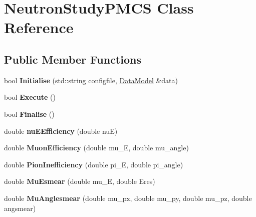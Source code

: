 \hypertarget{classNeutronStudyPMCS}{
\section{NeutronStudyPMCS Class Reference}
\label{classNeutronStudyPMCS}
}
\subsection*{Public Member Functions}
\begin{DoxyCompactItemize}
\item 
\hypertarget{classNeutronStudyPMCS_a044b07d39e07fbac5764b8788f11a3ec}{
bool {\bfseries Initialise} (std::string configfile, \hyperlink{classDataModel}{DataModel} \&data)}
\label{classNeutronStudyPMCS_a044b07d39e07fbac5764b8788f11a3ec}

\item 
\hypertarget{classNeutronStudyPMCS_a1cc06822548c3febc0708db5b59c343b}{
bool {\bfseries Execute} ()}
\label{classNeutronStudyPMCS_a1cc06822548c3febc0708db5b59c343b}

\item 
\hypertarget{classNeutronStudyPMCS_aa4e1c744c42f16c63b4ddefefda81922}{
bool {\bfseries Finalise} ()}
\label{classNeutronStudyPMCS_aa4e1c744c42f16c63b4ddefefda81922}

\item 
\hypertarget{classNeutronStudyPMCS_acdaa5568f44221b53168e490969393bf}{
double {\bfseries nuEEfficiency} (double nuE)}
\label{classNeutronStudyPMCS_acdaa5568f44221b53168e490969393bf}

\item 
\hypertarget{classNeutronStudyPMCS_aefc2ab996c1c513c0f032931f3f67e7e}{
double {\bfseries MuonEfficiency} (double mu\_\-E, double mu\_\-angle)}
\label{classNeutronStudyPMCS_aefc2ab996c1c513c0f032931f3f67e7e}

\item 
\hypertarget{classNeutronStudyPMCS_ad0cfe53c957f4a47fbe60f7bc390e32b}{
double {\bfseries PionInefficiency} (double pi\_\-E, double pi\_\-angle)}
\label{classNeutronStudyPMCS_ad0cfe53c957f4a47fbe60f7bc390e32b}

\item 
\hypertarget{classNeutronStudyPMCS_aa55a9508e67f6c758b1e7ecb7ff87a74}{
double {\bfseries MuEsmear} (double mu\_\-E, double Eres)}
\label{classNeutronStudyPMCS_aa55a9508e67f6c758b1e7ecb7ff87a74}

\item 
\hypertarget{classNeutronStudyPMCS_ad04d525456090178ee877757d120993a}{
double {\bfseries MuAnglesmear} (double mu\_\-px, double mu\_\-py, double mu\_\-pz, double angsmear)}
\label{classNeutronStudyPMCS_ad04d525456090178ee877757d120993a}


\end{DoxyCompactItemize}
